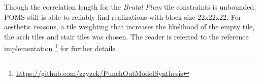 
Though the correlation length for the \textit{Brutal Plum} tile constraints is unbounded, POMS still is able to reliably find realizations with
block size 22x22x22.
For aesthetic reasons, a tile weighting that increases the likelihood of the empty tile, the arch tiles and
stair tiles was chosen.
The reader is referred to the reference implementation \footnote{ \label{poms-url} \url{https://github.com/zzyzek/PunchOutModelSynthesis} }
for further details.


